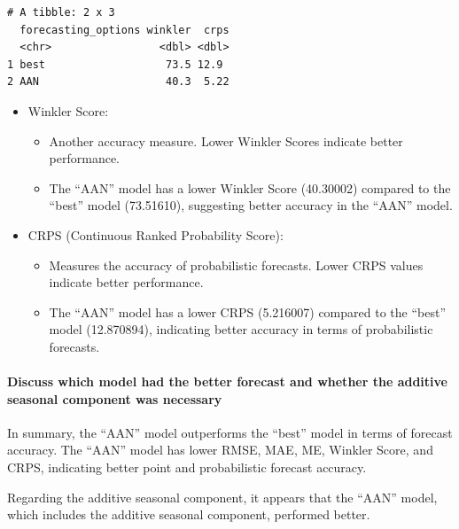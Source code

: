 \documentclass[
]{article}
\begin{document}
\begin{verbatim}
# A tibble: 2 x 3
  forecasting_options winkler  crps
  <chr>                 <dbl> <dbl>
1 best                   73.5 12.9 
2 AAN                    40.3  5.22
\end{verbatim}

\begin{itemize}
\item
  Winkler Score:

  \begin{itemize}
  \item
    Another accuracy measure. Lower Winkler Scores indicate better
    performance.
  \item
    The ``AAN'' model has a lower Winkler Score (40.30002) compared to
    the ``best'' model (73.51610), suggesting better accuracy in the
    ``AAN'' model.
  \end{itemize}
\item
  CRPS (Continuous Ranked Probability Score):

  \begin{itemize}
  \item
    Measures the accuracy of probabilistic forecasts. Lower CRPS values
    indicate better performance.
  \item
    The ``AAN'' model has a lower CRPS (5.216007) compared to the
    ``best'' model (12.870894), indicating better accuracy in terms of
    probabilistic forecasts.
  \end{itemize}
\end{itemize}

\hypertarget{discuss-which-model-had-the-better-forecast-and-whether-the-additive-seasonal-component-was-necessary}{%
\paragraph{Discuss which model had the better forecast and whether the
additive seasonal component was
necessary}\label{discuss-which-model-had-the-better-forecast-and-whether-the-additive-seasonal-component-was-necessary}}

In summary, the ``AAN'' model outperforms the ``best'' model in terms of
forecast accuracy. The ``AAN'' model has lower RMSE, MAE, ME, Winkler
Score, and CRPS, indicating better point and probabilistic forecast
accuracy.

Regarding the additive seasonal component, it appears that the ``AAN''
model, which includes the additive seasonal component, performed better.
\end{document}
